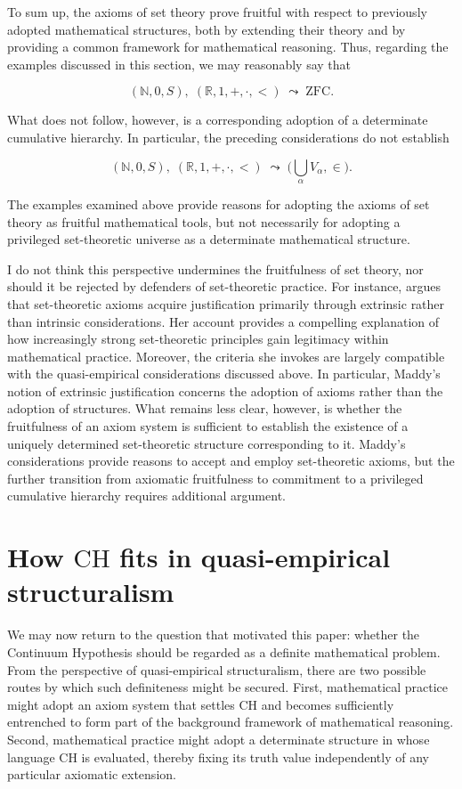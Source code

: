 \documentclass[11pt,a4paper]{book}
\theoremstyle{plain}
\begin{document}
To sum up, the axioms of set theory prove fruitful with respect to previously adopted mathematical structures, both by extending their theory and by providing a common framework for mathematical reasoning. Thus, regarding the examples discussed in this section, we may reasonably say that

$$(\mathbb N,0,S), \; (\mathbb{R},1, +, \cdot, <) \; \leadsto \; \mathrm{ZFC}.$$

What does not follow, however, is a corresponding adoption of a determinate cumulative hierarchy. In particular, the preceding considerations do not establish

$$(\mathbb N,0,S), \; (\mathbb{R},1, +, \cdot, <) \; \leadsto \; \big( \bigcup_{\alpha}V_\alpha,\in \big).$$

The examples examined above provide reasons for adopting the axioms of set theory as fruitful mathematical tools, but not necessarily for adopting a privileged set-theoretic universe as a determinate mathematical structure.
 
I do not think this perspective undermines the fruitfulness of set theory, nor should it be rejected by defenders of set-theoretic practice. For instance, \textcite{maddy1988believing1,maddy1988believing2} argues that set-theoretic axioms acquire justification primarily through extrinsic rather than intrinsic considerations. Her account provides a compelling explanation of how increasingly strong set-theoretic principles gain legitimacy within mathematical practice. Moreover, the criteria she invokes are largely compatible with the quasi-empirical considerations discussed above. In particular, Maddy's notion of extrinsic justification concerns the adoption of axioms rather than the adoption of structures. What remains less clear, however, is whether the fruitfulness of an axiom system is sufficient to establish the existence of a uniquely determined set-theoretic structure corresponding to it. Maddy's considerations provide reasons to accept and employ set-theoretic axioms, but the further transition from axiomatic fruitfulness to commitment to a privileged cumulative hierarchy requires additional argument.

\section{How \texorpdfstring{$\mathrm{CH}$}{CH} fits in quasi-empirical structuralism}
\label{section-CH-case}

We may now return to the question that motivated this paper: whether the Continuum Hypothesis should be regarded as a definite mathematical problem. From the perspective of quasi-empirical structuralism, there are two possible routes by which such definiteness might be secured. First, mathematical practice might adopt an axiom system that settles $\mathrm{CH}$ and becomes sufficiently entrenched to form part of the background framework of mathematical reasoning. Second, mathematical practice might adopt a determinate structure in whose language $\mathrm{CH}$ is evaluated, thereby fixing its truth value independently of any particular axiomatic extension.
\end{document}
